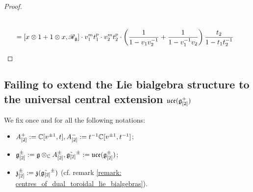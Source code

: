 \begin{proof}
\begin{enumerate}
$$\begin{aligned}
                                    \\
                                    & = [x \tensor 1 + 1 \tensor x, \scrR_{\g}] \cdot v_1^m t_1^p \cdot v_2^m t_2^p \cdot \left( \frac{1}{1 - v_1 v_2^{-1}} + \frac{1}{1 - v_1^{-1} v_2} \right) \frac{t_2}{1 - t_1 t_2^{-1}}
                                \end{aligned}
                            $$
                    \end{enumerate}
                \end{proof}

        \subsection{Failing to extend the Lie bialgebra structure to the universal central extension \texorpdfstring{$\mathfrak{uce}( \mathfrak{g}_{[2]}^+ )$}{}}
            \begin{convention}
                We fix once and for all the following notations:
                \begin{itemize}
                    \item $A_{[2]}^+ := \mathbb{C}[v^{\pm 1}, t], A_{[2]}^- := t^{-1}\mathbb{C}[v^{\pm 1}, t^{-1}]$;
                    \item $\g_{[2]}^{\pm} := \g \tensor_{\bbC} A_{[2]}^{\pm}, \tilde{ \g_{[2]} }^{\pm} := \uce(\g_{[2]}^{\pm})$;
                    \item $\mathfrak{z}_{[2]}^{\pm} := \mathfrak{z}(\tilde{ \mathfrak{g}_{[2]} }^{\pm})$ (cf. remark \ref{remark: centres_of_dual_toroidal_lie_bialgebras}).
                \end{itemize}
            \end{convention}
        
